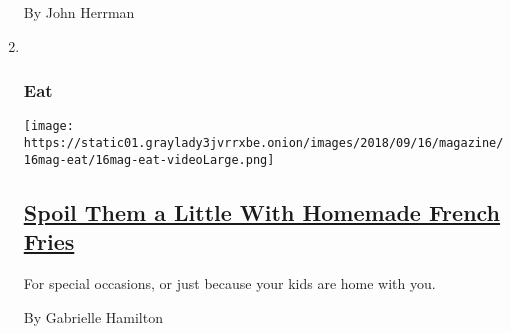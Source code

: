 \begin{enumerate}
  By John Herrman
\item ~
  \hypertarget{eat}{%
  \subsubsection{Eat}\label{eat}}

  \texttt{[image: https://static01.graylady3jvrrxbe.onion/images/2018/09/16/magazine/16mag-eat/16mag-eat-videoLarge.png]}

  \hypertarget{spoil-them-a-little-with-homemade-french-fries}{%
  \subsection{\texorpdfstring{\href{/2018/09/12/magazine/homemade-french-fries-kids.html}{Spoil
  Them a Little With Homemade French
  Fries}}{Spoil Them a Little With Homemade French Fries}}\label{spoil-them-a-little-with-homemade-french-fries}}

  For special occasions, or just because your kids are home with you.

  By Gabrielle Hamilton
\end{enumerate}

